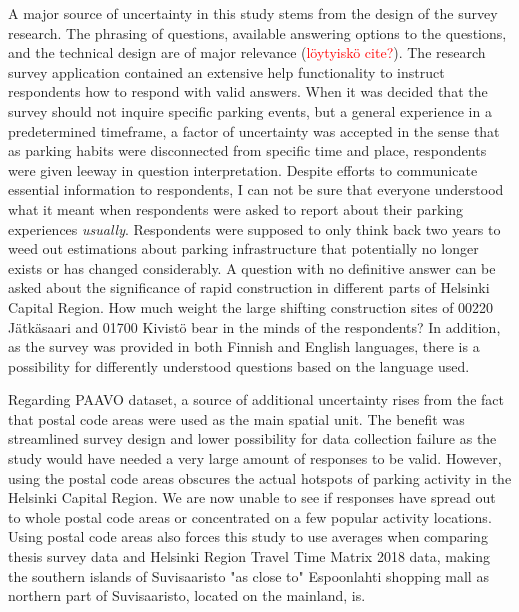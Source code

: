A major source of uncertainty in this study stems from the design of the survey research. The phrasing of questions, available answering options to the questions, and the technical design are of major relevance (\textcolor{red}{löytyiskö cite?}). The research survey application contained an extensive help functionality to instruct respondents how to respond with valid answers. When it was decided that the survey should not inquire specific parking events, but a general experience in a predetermined timeframe, a factor of uncertainty was accepted in the sense that as parking habits were disconnected from specific time and place, respondents were given leeway in question interpretation. Despite efforts to communicate essential information to respondents, I can not be sure that everyone understood what it meant when respondents were asked to report about their parking experiences \textit{usually}. Respondents were supposed to only think back two years to weed out estimations about parking infrastructure that potentially no longer exists or has changed considerably. A question with no definitive answer can be asked about the significance of rapid construction in different parts of Helsinki Capital Region. How much weight the large shifting construction sites of 00220 Jätkäsaari and 01700 Kivistö bear in the minds of the respondents? In addition, as the survey was provided in both Finnish and English languages, there is a possibility for differently understood questions based on the language used.

Regarding PAAVO dataset, a source of additional uncertainty rises from the fact that postal code areas were used as the main spatial unit. The benefit was streamlined survey design and lower possibility for data collection failure as the study would have needed a very large amount of responses to be valid. However, using the postal code areas obscures the actual hotspots of parking activity in the Helsinki Capital Region. We are now unable to see if responses have spread out to whole postal code areas or concentrated on a few popular activity locations. Using postal code areas also forces this study to use averages when comparing thesis survey data and Helsinki Region Travel Time Matrix 2018 data, making the southern islands of Suvisaaristo "as close to" Espoonlahti shopping mall as northern part of Suvisaaristo, located on the mainland, is.


